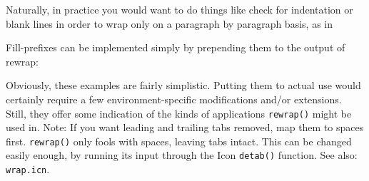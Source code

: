 Naturally, in practice you would want to do things like check for
indentation or blank lines in order to wrap only on a paragraph by
paragraph basis, as in


\noindent Fill-prefixes can be implemented simply by prepending them
to the output of rewrap:



Obviously, these examples are fairly simplistic. Putting them to actual
use would certainly require a few environment-specific modifications
and/or extensions. Still, they offer some indication of the kinds of
applications \texttt{rewrap()} might be used in. Note: If you want
leading and trailing tabs removed, map them to spaces first.
\texttt{rewrap()} only fools with spaces, leaving tabs intact. This can
be changed easily enough, by running its input through the Icon
\texttt{detab()} function.
See also: \texttt{wrap.icn}.


